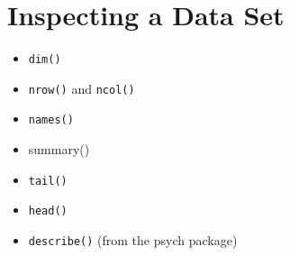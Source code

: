 


\section{Inspecting a Data Set}
\begin{itemize}
	\item \texttt{dim()}
	\item \texttt{nrow()} and \texttt{ncol()}
	\item \texttt{names()}
	\item summary()
	\item \texttt{tail()}
	\item \texttt{head()}
	\item \texttt{describe()} (from the psych package)
\end{itemize}
